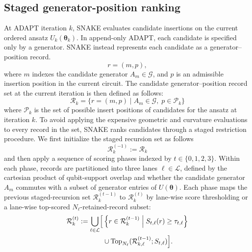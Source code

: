 \documentclass[
  reprint,
  amsmath,
  amssymb,
  aps,
  pra,
  nofootinbib,
  superscriptaddress,
  floatfix
]{revtex4-2}
\newcommand{\Gset}{\mathcal{G}}
\newcommand{\Pcal}{\mathcal{P}}
\begin{document}
\subsection{Staged generator-position ranking}
%
At ADAPT iteration \(k\), \textsc{SNAKE} evaluates candidate insertions on the current ordered ansatz \(U_k(\boldsymbol\theta_k)\). In append-only ADAPT, each candidate is specified only by a generator. \textsc{SNAKE} instead represents each candidate as a generator--position record.
\[
r = (m,p),
\]
%
where \(m\) indexes the candidate generator \(A_m\in\mathcal{G}\), and \(p\) is an admissible insertion position in the current circuit.
%
The candidate generator--position record set at the current iteration is then defined as follows:
\[
\mathcal{R}_k = \{ r=(m,p)\mid A_m\in\mathcal{G},\;p\in\Pcal_k\}
\label{record_set}
\]
%
where \(\Pcal_k\) is the set of possible insert positions of candidates for the ansatz at iteration \(k\). To avoid applying the expensive geometric and curvature evaluations to every record in the set, \textsc{SNAKE} ranks candidates through a staged restriction procedure. We first initialize the staged recursion set as follows
\[
\mathcal R_k^{(-1)} := \mathcal{R}_k
\]
and then apply a sequence of scoring phases indexed by \(t\in\{0,1,2,3\}\). Within each phase, records are partitioned into three lanes \(\ell\in\mathcal L\), defined by the cartesian product of qubit-support overlap and whether the candidate generator \(A_m\) commutes with a subset of generator entries of $U(\boldsymbol{\theta})$. Each phase maps the previous staged-recursion set \(\mathcal R_k^{(t-1)}\) to \(\mathcal R_k^{(t)}\) by lane-wise score thresholding or a lane-wise top-scored $N_\ell$-retained-record subset:
%
\begin{equation}
\begin{aligned}
\mathcal R_k^{(t)}
:=
 \bigcup_{\ell\in\mathcal L} \Bigl[
&\left\{
r\in\mathcal R_k^{(t-1)}
\;\middle|\;
S_{t,\ell}(r)\ge\tau_{t,\ell}\right\} \\
&{}\cup \operatorname{Top}_{N_\ell}(\mathcal{R}_{k,\ell}^{(t-1)};S_{t,\ell}) \Bigr].
\end{aligned}
\label{eq:phase_restriction_map}
\end{equation}
\end{document}
